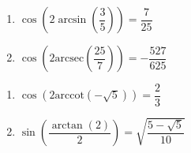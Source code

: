 \begin{multicols}{2}

\begin{enumerate}

\setcounter{enumi}{\value{HW}}

\item  $\cos\left(2 \arcsin\left(\dfrac{3}{5}\right)\right) = \dfrac{7}{25}$
\item  $\cos\left(2 \text{arcsec}\left(\dfrac{25}{7}\right)\right) = -\dfrac{527}{625}$

\setcounter{HW}{\value{enumi}}

\end{enumerate}

\end{multicols}

\begin{multicols}{2}

\begin{enumerate}

\setcounter{enumi}{\value{HW}}

\item  $\cos\left(2 \text{arccot}\left(-\sqrt{5}\right)\right) = \dfrac{2}{3}$ 
\item  $\sin\left( \dfrac{\arctan(2)}{2} \right) = \sqrt{\dfrac{5-\sqrt{5}}{10}}$ 

\setcounter{HW}{\value{enumi}}

\end{enumerate}

\end{multicols}

